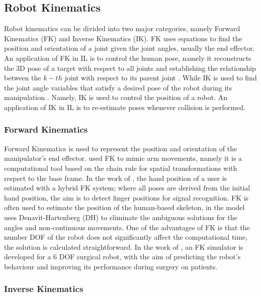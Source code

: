 \documentclass[thesis]{mas_proposal}
\begin{document}
    \subsection{Robot Kinematics}
    
    Robot kinematics can be divided into two major categories, namely Forward Kinematics (FK) and Inverse Kinematics (IK). FK uses equations to find the position and orientation of a joint given the joint angles, usually the end effector. An application of FK in IL is to control the human pose, namely it reconstructs the 3D pose of a target with respect to all joints and establishing the relationship between the $k-th$ joint with respect to its parent joint \cite{Li2021}. While IK is used to find the joint angle variables that satisfy a desired pose of the robot during its manipulation \cite{Hayat2015}. Namely, IK is used to control the position of a robot. An application of IK in IL is to re-estimate poses whenever collision is performed.
    
    \subsubsection{Forward Kinematics}
    
    Forward Kinematics is used to represent the position and orientation of the manipulator's end effector. \cite{Assad2020} used FK to mimic arm movements, namely it is a computational tool based on the chain rule for spatial transformations with respect to the base frame. In the work of \cite{Malik2017}, the hand position of a user is estimated with a hybrid FK system; where all poses are derived from the initial hand position, the aim is to detect finger positions for signal recognition. FK is often used to estimate the position of the human-based skeleton, in \cite{Huang2022} the model uses Denavit-Hartenberg (DH) to eliminate the ambiguous solutions for the angles and non-continuous movements. One of the advantages of FK is that the number DOF of the robot does not significantly affect the computational time, the solution is calculated straightforward. In the work of \cite{Shao2015}, an FK simulator is developed for a 6 DOF surgical robot, with the aim of predicting the robot's behaviour and improving its performance during surgery on patients.
    
    \subsubsection{Inverse Kinematics}
    
\end{document}

